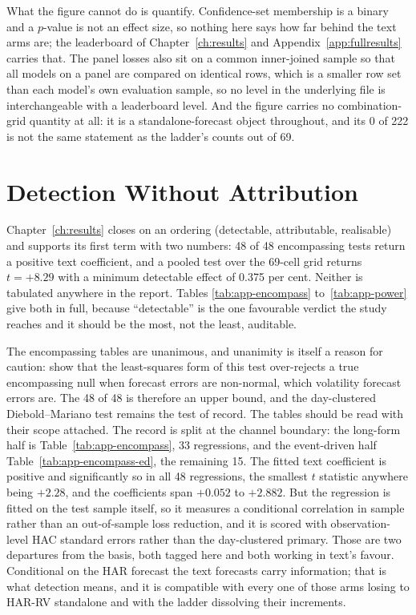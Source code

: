What the figure cannot do is quantify. Confidence-set membership is a binary
and a $p$-value is not an effect size, so nothing here says how far behind the
text arms are; the leaderboard of Chapter~\ref{ch:results} and
Appendix~\ref{app:fullresults} carries that. The panel losses also sit on a
common inner-joined sample so that all models on a panel are compared on
identical rows, which is a smaller row set than each model's own evaluation
sample, so no level in the underlying file is interchangeable with a
leaderboard level. And the figure carries no combination-grid quantity at all:
it is a standalone-forecast object throughout, and its 0 of 222 is not the
same statement as the ladder's counts out of 69.

\FloatBarrier
\section{Detection Without Attribution}
\label{app:res-detect}

Chapter~\ref{ch:results} closes on an ordering (detectable, attributable,
realisable) and supports its first term with two numbers: 48 of 48
encompassing tests return a positive text coefficient, and a pooled test
over the 69-cell grid returns $t = +8.29$ with a minimum detectable effect
of 0.375 per cent. Neither is tabulated anywhere in the report. Tables
\ref{tab:app-encompass} to~\ref{tab:app-power} give both in full, because
``detectable'' is the one favourable verdict the study reaches and it
should be the most, not the least, auditable.

The encompassing tables are unanimous, and unanimity is itself a reason for caution: \cite{harvey1998encompassing} show that the least-squares form of this test over-rejects a true encompassing null when forecast errors are non-normal, which volatility forecast errors are. The 48 of 48 is therefore an upper bound, and the day-clustered Diebold--Mariano test remains the test of record. The tables should be read with their scope
attached. The record is split at the channel boundary: the long-form half is
Table~\ref{tab:app-encompass}, 33 regressions, and the event-driven half
Table~\ref{tab:app-encompass-ed}, the remaining 15. %
The fitted text coefficient is positive and significantly so in
all 48 regressions, the smallest $t$ statistic anywhere being $+2.28$, and
the coefficients span $+0.052$ to $+2.882$. But the regression is fitted on
the test sample itself, so it measures a conditional correlation in sample
rather than an out-of-sample loss reduction, and it is scored with
observation-level HAC standard errors rather than the day-clustered primary.
Those are two departures from the basis, both tagged here and both working in
text's favour. Conditional on the HAR forecast the text forecasts carry
information; that is what detection means, and it is compatible with every
one of those arms losing to HAR-RV standalone and with the ladder
dissolving their increments.

